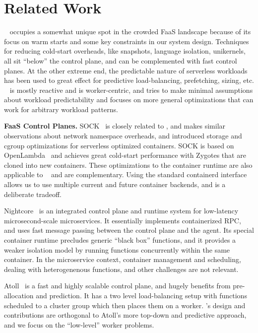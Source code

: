\section{Related Work}
\label{sec:related}

\sysname~ occupies a somewhat unique spot in the crowded FaaS landscape because of its focus on warm starts and some key constraints in our system design.
%
Techniques for reducing cold-start overheads, like snapshots, language isolation,  unikernels, all sit ``below'' the control plane, and can be complemented with fast control planes.
At the other extreme end, the predictable nature of serverless workloads has been used to great effect for predictive load-balancing, prefetching, sizing, etc.
\sysname~ is mostly reactive and is worker-centric, and tries to make minimal assumptions about workload predictability and focuses on more general optimizations that can work for arbitrary workload patterns.
%

\noindent \textbf{FaaS Control Planes.}
%
SOCK~\cite{oakes_sock_2018} is closely related to \sysname, and makes similar observations about network namespace overheads, and introduced storage and cgroup optimizations for serverless optimized containers. 
SOCK is based on OpenLambda~\cite{hendrickson2016serverless} and achieves great cold-start performance with Zygotes that are cloned into new containers.
These optimizations to the container runtime are also applicable to \sysname~ and are complementary. 
Using the standard containerd interface allows us to use multiple current and future container backends, and is a deliberate tradeoff. 


Nightcore~\cite{jia2021nightcore} is an integrated control plane and runtime system for low-latency microsecond-scale microservices.
It essentially implements containerized RPC, and uses fast message passing between the control plane and the agent.
Its special container runtime precludes generic ``black box'' functions, and it provides a weaker isolation model by running functions concurrently within the same container.
In the microservice context, container management and scheduling, dealing with heterogenenous functions, and other challenges are not relevant.


Atoll~\cite{singhvi2021atoll} is a fast and highly scalable control plane, and hugely benefits from pre-allocation and prediction.
It has a two level load-balancing setup with functions scheduled to a cluster group which then places them on a worker. 
\sysname's design and contributions are orthogonal to Atoll's more top-down and predictive approach, and we focus on the ``low-level'' worker problems.


